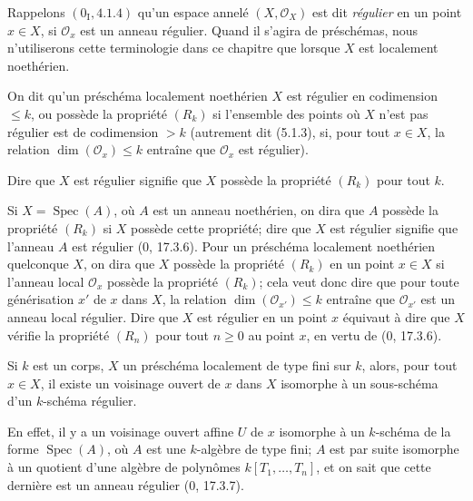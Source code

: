 \begin{env}[5.8.1]
\label{IV.2.s5.8.1-fr}
Rappelons $(0_{\mathrm I},4.1.4)$ qu'un espace annelé
$(X,\mathcal O_X)$ est dit \emph{régulier} en un point $x\in X$, si
$\mathcal O_x$ est un anneau régulier. Quand il s'agira de préschémas, nous
n'utiliserons cette terminologie dans ce chapitre que lorsque $X$ est
localement noethérien.
\end{env}

\begin{definition}[5.8.2]
\label{IV.2.s5.8.2-fr}
On dit qu'un préschéma localement noethérien $X$ est régulier en codimension
$\leq k$, ou possède la propriété $(R_k)$ si l'ensemble des points où $X$
n'est pas régulier est de codimension $>k$ (autrement dit (5.1.3), si, pour
tout $x\in X$, la relation $\dim(\mathcal O_x)\leq k$ entraîne que
$\mathcal O_x$ est régulier).
\end{definition}

Dire que $X$ est régulier signifie que $X$ possède la propriété $(R_k)$ pour
tout $k$.

Si $X=\operatorname{Spec}(A)$, où $A$ est un anneau noethérien, on dira que
$A$ possède la propriété $(R_k)$ si $X$ possède cette propriété; dire que
$X$ est régulier signifie que l'anneau $A$ est régulier (0, 17.3.6). Pour un
préschéma localement noethérien quelconque $X$, on dira que $X$ possède la
propriété $(R_k)$ en un point $x\in X$ si l'anneau local $\mathcal O_x$
possède la propriété $(R_k)$; cela veut donc dire que pour toute générisation
$x'$ de $x$ dans $X$, la relation $\dim(\mathcal O_{x'})\leq k$ entraîne que
$\mathcal O_{x'}$ est un anneau local régulier. Dire que $X$ est régulier en
un point $x$ équivaut à dire que $X$ vérifie la propriété $(R_n)$ pour tout
$n\geq0$ au point $x$, en vertu de (0, 17.3.6).

\begin{proposition}[5.8.3]
\label{IV.2.s5.8.3-fr}
Si $k$ est un corps, $X$ un préschéma localement de type fini sur $k$, alors,
pour tout $x\in X$, il existe un voisinage ouvert de $x$ dans $X$ isomorphe à
un sous-schéma d'un $k$-schéma régulier.
\end{proposition}

En effet, il y a un voisinage ouvert affine $U$ de $x$ isomorphe à un
$k$-schéma de la forme $\operatorname{Spec}(A)$, où $A$ est une $k$-algèbre
de type fini; $A$ est par suite isomorphe à un quotient d'une algèbre de
polynômes $k[T_1,\ldots,T_n]$, et on sait que cette dernière est un anneau
régulier (0, 17.3.7).

